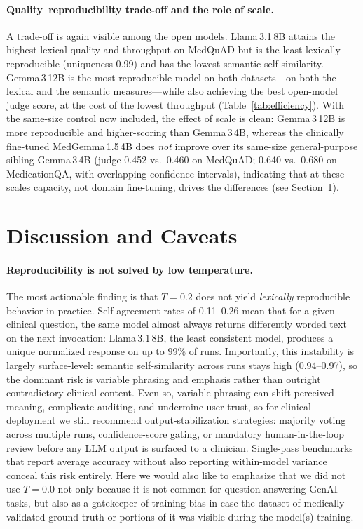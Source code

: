\documentclass[11pt]{article}
\begin{document}
\paragraph{Quality--reproducibility trade-off and the role of scale.}
A trade-off is again visible among the open models. Llama\,3.1\,8B attains
the highest lexical quality and throughput on MedQuAD but is the least
lexically reproducible (uniqueness 0.99) and has the lowest semantic
self-similarity. Gemma\,3\,12B is the most reproducible model on both
datasets---on both the lexical and the semantic measures---while also
achieving the best open-model judge score, at the cost of the lowest
throughput (Table~\ref{tab:efficiency}). With the same-size control now
included, the effect of scale is clean: Gemma\,3\,12B is more reproducible
and higher-scoring than Gemma\,3\,4B, whereas the clinically fine-tuned
MedGemma\,1.5\,4B does \emph{not} improve over its same-size
general-purpose sibling Gemma\,3\,4B (judge 0.452 vs.\ 0.460 on MedQuAD;
0.640 vs.\ 0.680 on MedicationQA, with overlapping confidence intervals),
indicating that at these scales capacity, not domain fine-tuning, drives
the differences (see Section~\ref{sec:discussion}).

\section{Discussion and Caveats}
\label{sec:discussion}

\paragraph{Reproducibility is not solved by low temperature.}
The most actionable finding is that $T{=}0.2$ does not yield
\emph{lexically} reproducible behavior in practice.
Self-agreement rates of 0.11--0.26 mean that for a given clinical
question, the same model almost always returns differently worded text
on the next invocation: Llama\,3.1\,8B, the least consistent model,
produces a unique normalized response on up to 99\% of runs.
Importantly, this instability is largely surface-level: semantic
self-similarity across runs stays high (0.94--0.97), so the dominant
risk is variable phrasing and emphasis rather than outright
contradictory clinical content. Even so, variable phrasing can shift
perceived meaning, complicate auditing, and undermine user trust, so for
clinical deployment we still recommend output-stabilization
strategies: majority voting across multiple runs, confidence-score
gating, or mandatory human-in-the-loop review before any LLM output
is surfaced to a clinician.
Single-pass benchmarks that report average accuracy without also
reporting within-model variance conceal this risk entirely. Here 
we would also like to emphasize that we did not use $T{=}0.0$ not
only because it is not common for question answering GenAI tasks,
but also as a gatekeeper of training bias in case the dataset 
of medically validated ground-truth or portions of it was visible
during the model(s) training. 
\end{document}
